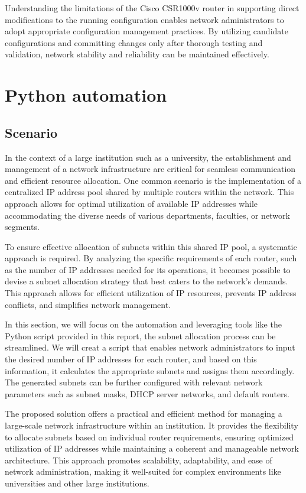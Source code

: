 Understanding the limitations of the Cisco CSR1000v router in supporting direct modifications to the running configuration enables network administrators to adopt appropriate configuration management practices. By utilizing candidate configurations and committing changes only after thorough testing and validation, network stability and reliability can be maintained effectively.

\section{Python automation}
\subsection{Scenario}

In the context of a large institution such as a university, the establishment and management of a network infrastructure are critical for seamless communication and efficient resource allocation. One common scenario is the implementation of a centralized IP address pool shared by multiple routers within the network. This approach allows for optimal utilization of available IP addresses while accommodating the diverse needs of various departments, faculties, or network segments.

To ensure effective allocation of subnets within this shared IP pool, a systematic approach is required. By analyzing the specific requirements of each router, such as the number of IP addresses needed for its operations, it becomes possible to devise a subnet allocation strategy that best caters to the network's demands. This approach allows for efficient utilization of IP resources, prevents IP address conflicts, and simplifies network management.

In this section, we will focus on the automation and leveraging tools like the Python script provided in this report, the subnet allocation process can be streamlined. We will creat a script that enables network administrators to input the desired number of IP addresses for each router, and based on this information, it calculates the appropriate subnets and assigns them accordingly. The generated subnets can be further configured with relevant network parameters such as subnet masks, DHCP server networks, and default routers.

The proposed solution offers a practical and efficient method for managing a large-scale network infrastructure within an institution. It provides the flexibility to allocate subnets based on individual router requirements, ensuring optimized utilization of IP addresses while maintaining a coherent and manageable network architecture. This approach promotes scalability, adaptability, and ease of network administration, making it well-suited for complex environments like universities and other large institutions.

